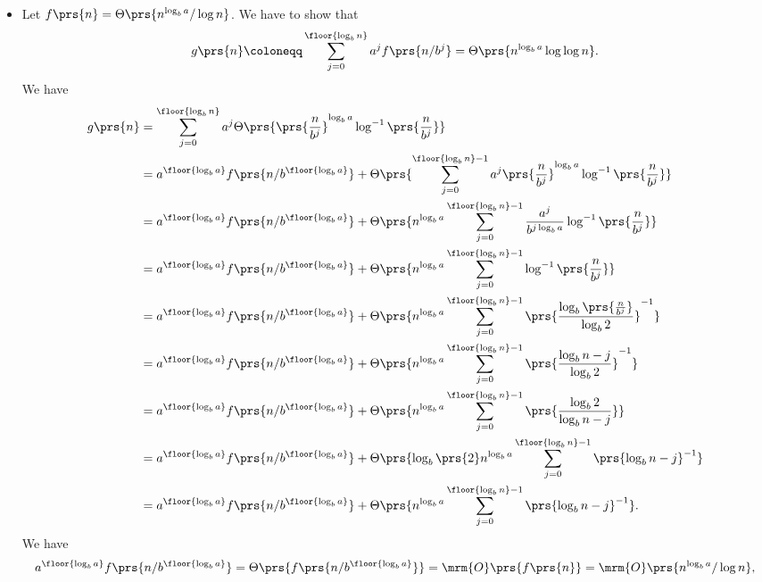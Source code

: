 \documentclass[oneside]{scrbook}
\theoremstyle{definition}
\begin{document}
\begin{exercise} \label{exercise:master-k-minus-1}
\begin{itemize}
\item Let $f\prs{n} = \Theta\prs{n^{\log_b a} / \log n}$.
We have to show that
\begin{align*}
g\prs{n} \coloneqq \sum_{j=0}^{\floor{\log_b n}} a^j f\prs{n/b^j} = \Theta\prs{n^{\log_b a} \log \log n} \text{.}
\end{align*}
We have
\begin{align*}
g\prs{n} &= \sum_{j=0}^{\floor{\log_b n}} a^j \Theta\prs{\prs{\frac{n}{b^j}}^{\log_b a} \log^{-1} \prs{\frac{n}{b^j}}}
\\&= a^{\floor{\log_b a}} f\prs{n / b^{\floor{\log_b a}}} + \Theta\prs{\sum_{j=0}^{\floor{\log_b n} - 1} a^j \prs{\frac{n}{b^j}}^{\log_b a} \log^{-1} \prs{\frac{n}{b^j}}}
\\&= a^{\floor{\log_b a}} f\prs{n / b^{\floor{\log_b a}}} + \Theta\prs{n^{\log_b a} \sum_{j=0}^{\floor{\log_b n} - 1} \frac{a^j}{b^{j \log_b a}} \log^{-1} \prs{\frac{n}{b^j}}}
\\&= a^{\floor{\log_b a}} f\prs{n / b^{\floor{\log_b a}}} + \Theta\prs{n^{\log_b a} \sum_{j=0}^{\floor{\log_b n} - 1} \log^{-1}\prs{\frac{n}{b^j}}}
\\&= a^{\floor{\log_b a}} f\prs{n / b^{\floor{\log_b a}}} + \Theta\prs{n^{\log_b a} \sum_{j=0}^{\floor{\log_b n} - 1} \prs{\frac{\log_b \prs{\frac{n}{b^j}}}{\log_b 2}}^{-1}}
\\&= a^{\floor{\log_b a}} f\prs{n / b^{\floor{\log_b a}}} + \Theta\prs{n^{\log_b a} \sum_{j=0}^{\floor{\log_b n} - 1} \prs{\frac{\log_b n - j}{\log_b 2}}^{-1}}
\\&= a^{\floor{\log_b a}} f\prs{n / b^{\floor{\log_b a}}} + \Theta\prs{n^{\log_b a} \sum_{j=0}^{\floor{\log_b n} - 1} \prs{\frac{\log_b 2}{\log_b n - j}}}
\\&= a^{\floor{\log_b a}} f\prs{n / b^{\floor{\log_b a}}} + \Theta\prs{\log_b \prs{2} n^{\log_b a} \sum_{j=0}^{\floor{\log_b n} - 1} \prs{\log_b n - j}^{-1}}
\\&= a^{\floor{\log_b a}} f\prs{n / b^{\floor{\log_b a}}} + \Theta\prs{n^{\log_b a} \sum_{j=0}^{\floor{\log_b n} - 1} \prs{\log_b n - j}^{-1}} \text{.}
\end{align*}
We have
\begin{align*}
a^{\floor{\log_b a}} f\prs{n / b^{\floor{\log_b a}}} = \Theta\prs{f\prs{n / b^{\floor{\log_b a}}}} = \mrm{O}\prs{f\prs{n}} = \mrm{O}\prs{n^{\log_b a} / \log n} \text{,}
\end{align*}

\end{itemize}
\end{exercise}
\end{document}
